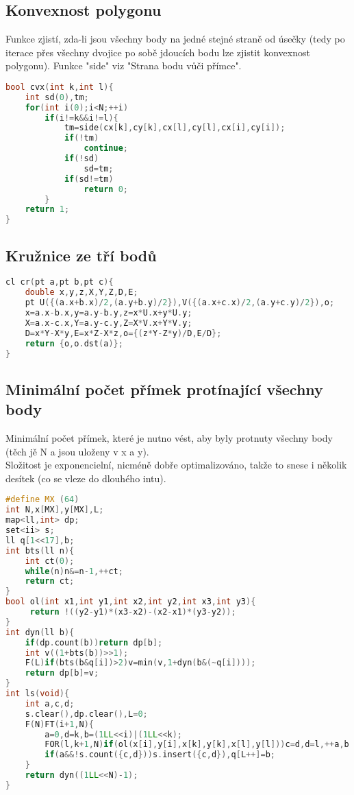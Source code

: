 \documentclass[11pt]{article}
\begin{document}
\subsection{Konvexnost polygonu}
Funkce zjistí, zda-li jsou všechny body na jedné stejné straně od úsečky (tedy po iterace přes všechny dvojice po sobě jdoucích bodu lze zjistit konvexnost polygonu).
Funkce "side" viz "Strana bodu vůči přímce".
\begin{lstlisting}[language=C++]
bool cvx(int k,int l){
    int sd(0),tm;
    for(int i(0);i<N;++i)
        if(i!=k&&i!=l){
            tm=side(cx[k],cy[k],cx[l],cy[l],cx[i],cy[i]);
            if(!tm)
                continue;
            if(!sd)
                sd=tm;
            if(sd!=tm)
                return 0;
        }
    return 1;
}
\end{lstlisting}
\subsection{Kružnice ze tří bodů}
\begin{lstlisting}[language=C++]
cl cr(pt a,pt b,pt c){
    double x,y,z,X,Y,Z,D,E;
    pt U({(a.x+b.x)/2,(a.y+b.y)/2}),V({(a.x+c.x)/2,(a.y+c.y)/2}),o;
    x=a.x-b.x,y=a.y-b.y,z=x*U.x+y*U.y;
    X=a.x-c.x,Y=a.y-c.y,Z=X*V.x+Y*V.y;
    D=x*Y-X*y,E=x*Z-X*z,o={(z*Y-Z*y)/D,E/D};
    return {o,o.dst(a)};
}
\end{lstlisting}
\subsection{Minimální počet přímek protínající všechny body}
Minimální počet přímek, které je nutno vést, aby byly protnuty všechny body (těch jě \textsf{N} a jsou uloženy v \textsf{x} a \textsf{y}).
\\Složitost je exponencielní, nicméně dobře optimalizováno, takže to snese i několik desítek (co se vleze do dlouhého intu).
\begin{lstlisting}[language=C++]
#define MX (64)
int N,x[MX],y[MX],L;
map<ll,int> dp;
set<ii> s;
ll q[1<<17],b;
int bts(ll n){
    int ct(0);
    while(n)n&=n-1,++ct;
    return ct;
}
bool ol(int x1,int y1,int x2,int y2,int x3,int y3){
     return !((y2-y1)*(x3-x2)-(x2-x1)*(y3-y2));
}
int dyn(ll b){
    if(dp.count(b))return dp[b];
    int v((1+bts(b))>>1);
    F(L)if(bts(b&q[i])>2)v=min(v,1+dyn(b&(~q[i])));
    return dp[b]=v;
}
int ls(void){
    int a,c,d;
    s.clear(),dp.clear(),L=0;
    F(N)FT(i+1,N){
        a=0,d=k,b=(1LL<<i)|(1LL<<k);
        FOR(l,k+1,N)if(ol(x[i],y[i],x[k],y[k],x[l],y[l]))c=d,d=l,++a,b|=(1LL<<l);
        if(a&&!s.count({c,d}))s.insert({c,d}),q[L++]=b;
    }
    return dyn((1LL<<N)-1);
}
\end{lstlisting}
\end{document}

